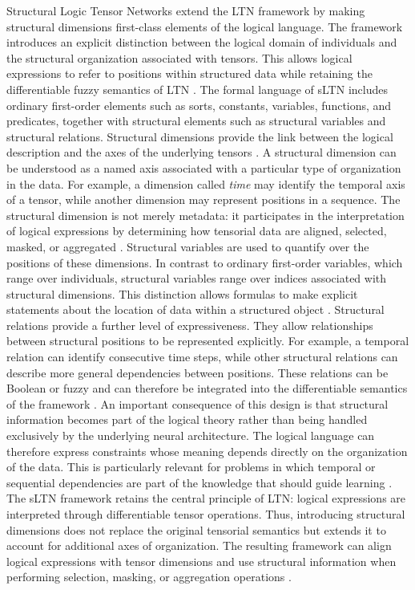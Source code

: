 \noindent
Structural Logic Tensor Networks extend the LTN framework by making structural dimensions first-class elements of the logical language. The framework introduces an explicit distinction between the logical domain of individuals and the structural organization associated with tensors. This allows logical expressions to refer to positions within structured data while retaining the differentiable fuzzy semantics of LTN \cite{rinaldi2026sltn}.
The formal language of sLTN includes ordinary first-order elements such as sorts, constants, variables, functions, and predicates, together with structural elements such as structural variables and structural relations. Structural dimensions provide the link between the logical description and the axes of the underlying tensors \cite{rinaldi2026sltn}.
A structural dimension can be understood as a named axis associated with a particular type of organization in the data. For example, a dimension called \textit{time} may identify the temporal axis of a tensor, while another dimension may represent positions in a sequence. The structural dimension is not merely metadata: it participates in the interpretation of logical expressions by determining how tensorial data are aligned, selected, masked, or aggregated \cite{rinaldi2026sltn}.
Structural variables are used to quantify over the positions of these dimensions. In contrast to ordinary first-order variables, which range over individuals, structural variables range over indices associated with structural dimensions. This distinction allows formulas to make explicit statements about the location of data within a structured object \cite{rinaldi2026sltn}.
Structural relations provide a further level of expressiveness. They allow relationships between structural positions to be represented explicitly. For example, a temporal relation can identify consecutive time steps, while other structural relations can describe more general dependencies between positions. These relations can be Boolean or fuzzy and can therefore be integrated into the differentiable semantics of the framework \cite{rinaldi2026sltn}.
An important consequence of this design is that structural information becomes part of the logical theory rather than being handled exclusively by the underlying neural architecture. The logical language can therefore express constraints whose meaning depends directly on the organization of the data. This is particularly relevant for problems in which temporal or sequential dependencies are part of the knowledge that should guide learning \cite{rinaldi2026sltn}.
The sLTN framework retains the central principle of LTN: logical expressions are interpreted through differentiable tensor operations. Thus, introducing structural dimensions does not replace the original tensorial semantics but extends it to account for additional axes of organization. The resulting framework can align logical expressions with tensor dimensions and use structural information when performing selection, masking, or aggregation operations \cite{rinaldi2026sltn}.
